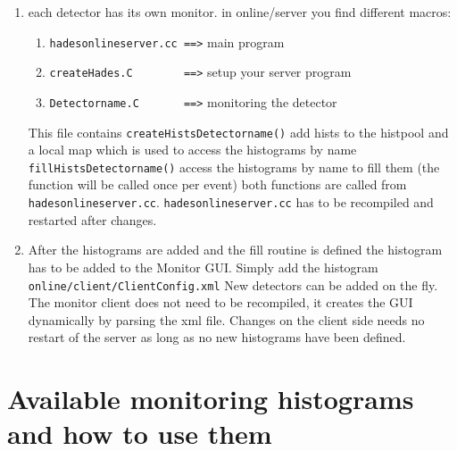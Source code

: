 \begin{enumerate}
 \item	each detector has its own monitor. 
 in online/server you find different macros:
 \begin{enumerate}
    \item \verb+hadesonlineserver.cc ==>+ main program
    \item \verb+createHades.C        ==>+ setup your server program
    \item \verb+Detectorname.C       ==>+ monitoring the detector
  \end{enumerate}
  This file contains
  \verb+createHistsDetectorname()+ 
  add hists to the histpool and a local map which is
  used to access the histograms by name
  \verb+fillHistsDetectorname()+ 
  access the histograms by name to fill them (the function
  will be called once per event)
  both functions are called from \verb+hadesonlineserver.cc+.
  \verb+hadesonlineserver.cc+ has to be recompiled and restarted
  after changes.

 \item	After the histograms are added and the fill routine is
      	defined the histogram has to be added to the Monitor GUI.
       	Simply add the histogram \verb+online/client/ClientConfig.xml+
      	New detectors can be added on the fly. The monitor client
       	does not need to be recompiled, it creates the GUI dynamically
       	by parsing the xml file. Changes on the client side needs
       	no restart of the server as long as no new histograms have
       	been defined.
\end{enumerate}

\section{Available monitoring histograms and how to use them}

